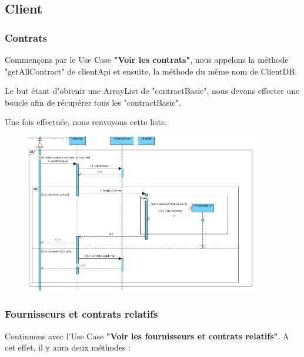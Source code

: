 \newpage
\subsection{Client}

\subsubsection{Contrats}\label{CONTRATS}

\begin{flushleft}
Commençons par le Use Case \textbf{"Voir les contrats"}, nous appelons la méthode "getAllContract" de clientApi et ensuite, la méthode du même nom de ClientDB.
\end{flushleft}

\begin{flushleft}
Le but étant d'obtenir une ArrayList de "contractBasic", nous devons effecter une boucle afin de récupérer tous les "contractBasic".
\end{flushleft}

\begin{flushleft}
Une fois effectuée, nous renvoyons cette liste.
\end{flushleft}

\begin{figure}[h]
\centering
\includegraphics[width = 0.9\textwidth]{Base/sequence/img/client/Voir-les-contrats.png}
\end{figure}

\newpage

\subsubsection{Fournisseurs et
contrats relatifs}
\begin{flushleft}
Continuons avec l'Use Case \textbf{"Voir les fournisseurs et
contrats relatifs"}.
A cet effet, il y aura deux méthodes :
\end{flushleft}

